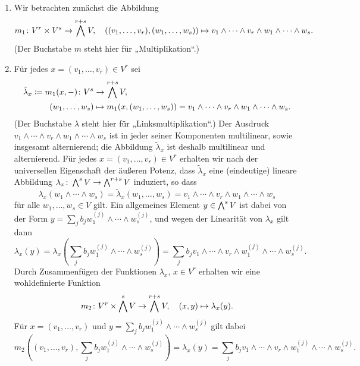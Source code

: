 \begin{enumerate}
  \item
    Wir betrachten zunächst die Abbildung
    \[
              m_1
      \colon  V^r \times V^s
      \to     \bigwedge^{r+s} V,
      \quad   ((v_1, \dotsc, v_r), (w_1, \dotsc, w_s))
      \mapsto v_1 \wedge \dotsb \wedge v_r \wedge w_1 \wedge \dotsb \wedge w_s.
    \]
    (Der Buchstabe $m$ steht hier für „Multiplikation“.)
  \item
    Für jedes $x = (v_1, \dotsc, v_r) \in V^r$ sei
    \begin{align*}
                  \tilde{\lambda}_x
       \coloneqq  m_1(x, -)
       \colon     V^s
      &\to        \bigwedge^{r+s} V,
      \\
                  (w_1, \dotsc, w_s)
      &\mapsto    m_1(x, (w_1, \dotsc, w_s))
       =          v_1 \wedge \dotsb \wedge v_r \wedge w_1 \wedge \dotsb \wedge w_s.
    \end{align*}
    (Der Buchstabe $\lambda$ steht hier für „Linksmultiplikation“.)
    Der Ausdruck $v_1 \wedge \dotsb \wedge v_r \wedge w_1 \wedge \dotsb \wedge w_s$ ist in jeder seiner Komponenten multilinear, sowie insgesamt alternierend;
    die Abbildung $\tilde{\lambda}_x$ ist deshalb multilinear und alternierend.
    Für jedes $x = (v_1, \dotsc, v_r) \in V^r$ erhalten wir nach der universellen Eigenschaft der äußeren Potenz, dass $\tilde{\lambda}_x$ eine (eindeutige) lineare Abbildung $\lambda_x \colon \bigwedge^{s} V \to \bigwedge^{r+s} V$ induziert, so dass
    \[
        \lambda_x( w_1 \wedge \dotsb \wedge w_s )
      = \tilde{\lambda}_x(w_1, \dotsc, w_s)
      = v_1 \wedge \dotsb \wedge v_r \wedge w_1 \wedge \dotsb \wedge w_s
    \]
    für alle $w_1, \dotsc, w_s \in V$ gilt.
    Ein allgemeines Element $y \in \bigwedge^{s} V$ ist dabei von der Form $y = \sum_j b_j w^{(j)}_1 \wedge \dotsb \wedge w^{(j)}_s$, und wegen der Linearität von $\lambda_x$ gilt dann
    \[
        \lambda_x( y )
      = \lambda_x\left( \sum_j b_j w^{(j)}_1 \wedge \dotsb \wedge w^{(j)}_s \right)
      = \sum_j b_j v_1 \wedge \dotsb \wedge v_r \wedge w^{(j)}_1 \wedge \dotsb \wedge w^{(j)}_s.
    \]
    Durch Zusammenfügen der Funktionen $\lambda_x$, $x \in V^r$ erhalten wir eine wohldefinierte Funktion
    \[
              m_2
      \colon  V^r \times \bigwedge^{s} V
      \to     \bigwedge^{r+s} V,
      \quad   (x, y)
      \mapsto \lambda_x(y).
    \]
    Für $x = (v_1, \dotsc, v_r)$ und $y = \sum_j b_j w^{(j)}_1 \wedge \dotsb \wedge w^{(j)}_s$ gilt dabei
    \[
        m_2\left( (v_1, \dotsc, v_r), \sum_j b_j w^{(j)}_1 \wedge \dotsb \wedge w^{(j)}_s \right)
      = \lambda_x(y)
      = \sum_j b_j v_1 \wedge \dotsb \wedge v_r \wedge w^{(j)}_1 \wedge \dotsb \wedge w^{(j)}_s.
    \]
    

\end{enumerate}
